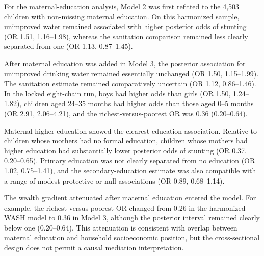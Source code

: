 For the maternal-education analysis, Model 2 was first refitted to the 4,503 children with non-missing maternal education. On this harmonized sample, unimproved water remained associated with higher posterior odds of stunting (OR 1.51, 1.16--1.98), whereas the sanitation comparison remained less clearly separated from one (OR 1.13, 0.87--1.45).

After maternal education was added in Model 3, the posterior association for unimproved drinking water remained essentially unchanged (OR 1.50, 1.15--1.99). The sanitation estimate remained comparatively uncertain (OR 1.12, 0.86--1.46). In the locked eight-chain run, boys had higher odds than girls (OR 1.50, 1.24--1.82), children aged 24--35 months had higher odds than those aged 0--5 months (OR 2.91, 2.06--4.21), and the richest-versus-poorest OR was 0.36 (0.20--0.64).

Maternal higher education showed the clearest education association. Relative to children whose mothers had no formal education, children whose mothers had higher education had substantially lower posterior odds of stunting (OR 0.37, 0.20--0.65). Primary education was not clearly separated from no education (OR 1.02, 0.75--1.41), and the secondary-education estimate was also compatible with a range of modest protective or null associations (OR 0.89, 0.68--1.14).

The wealth gradient attenuated after maternal education entered the model. For example, the richest-versus-poorest OR changed from 0.26 in the harmonized WASH model to 0.36 in Model 3, although the posterior interval remained clearly below one (0.20--0.64). This attenuation is consistent with overlap between maternal education and household socioeconomic position, but the cross-sectional design does not permit a causal mediation interpretation.

